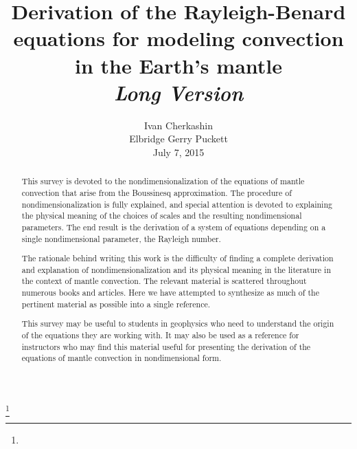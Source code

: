\documentclass[oneside]{amsbook}
\renewcommand{\today}{July 7, 2015}
\theoremstyle{definition}
\theoremstyle{remark}
\numberwithin{section}{chapter}
\numberwithin{equation}{chapter}
\begin{document}
\frontmatter

\title{Derivation of the Rayleigh-Benard equations for modeling convection in the Earth's mantle \\ \textit{Long Version}}


\author{Ivan Cherkashin \\ Elbridge Gerry Puckett \\ \today}
\curraddr{}

\address{}
\curraddr{}
\thanks{}




\begin{abstract}

This survey is devoted to the nondimensionalization of the equations of mantle convection that arise from the Boussinesq approximation. The procedure of nondimensionalization is fully explained, and special attention is devoted to explaining the physical meaning of the choices of scales and the resulting nondimensional parameters. The end result is the derivation of a system of equations depending on a single nondimensional parameter, the Rayleigh number.

The rationale behind writing this work is the difficulty of finding a complete derivation and explanation of nondimensionalization and its physical meaning in the literature in the context of mantle convection. The relevant material is scattered throughout numerous books and articles. Here we have attempted to synthesize as much of the pertinent material as possible into a single reference.

This survey may be useful to students in geophysics who need to understand the origin of the equations they are working with. It may also be used as a reference for instructors who may find this material useful for presenting the derivation of the equations of mantle convection in nondimensional form.

\end{abstract}
\end{document}
